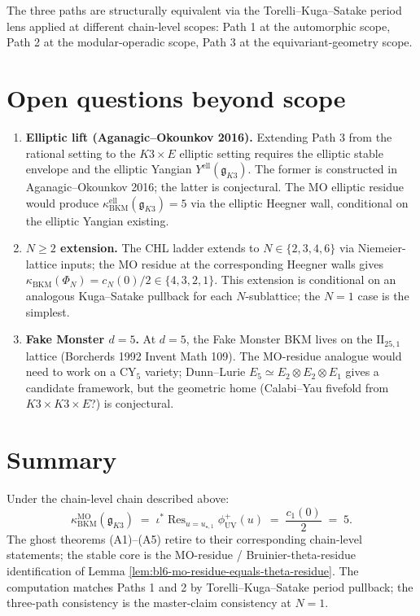 The three paths are structurally equivalent via the
Torelli--Kuga--Satake period lens applied at different chain-level
scopes: Path 1 at the automorphic scope, Path 2 at the
modular-operadic scope, Path 3 at the equivariant-geometry scope.

\section*{Open questions beyond scope}

\begin{enumerate}
\item \textbf{Elliptic lift (Aganagic--Okounkov 2016).}  Extending
   Path 3 from the rational setting to the $K3 \times E$ elliptic
   setting requires the elliptic stable envelope and the elliptic
   Yangian $Y^{\mathrm{ell}}(\mathfrak g_{K3})$.  The former is
   constructed in Aganagic--Okounkov 2016; the latter is
   conjectural.  The MO elliptic residue would produce
   $\kappa_{\mathrm{BKM}}^{\mathrm{ell}}(\mathfrak g_{K3}) = 5$ via
   the elliptic Heegner wall, conditional on the elliptic Yangian
   existing.

\item \textbf{$N \geq 2$ extension.}  The CHL ladder extends to
   $N \in \{2, 3, 4, 6\}$ via Niemeier-lattice inputs; the MO
   residue at the corresponding Heegner walls gives
   $\kappa_{\mathrm{BKM}}(\Phi_{N}) = c_{N}(0)/2 \in \{4, 3, 2, 1\}$.
   This extension is conditional on an analogous Kuga--Satake pullback
   for each $N$-sublattice; the $N = 1$ case is the simplest.

\item \textbf{Fake Monster $d = 5$.}  At $d = 5$, the Fake Monster
   BKM lives on the $\mathrm{II}_{25, 1}$ lattice (Borcherds 1992
   Invent Math 109).  The MO-residue analogue would need to work
   on a CY$_{5}$ variety; Dunn--Lurie $E_{5} \simeq
   E_{2} \otimes E_{2} \otimes E_{1}$ gives a candidate framework,
   but the geometric home (Calabi--Yau fivefold from
   $K3 \times K3 \times E$?) is conjectural.
\end{enumerate}

\section*{Summary}

Under the chain-level chain described above:
\[
   \boxed{\;
      \kappa_{\mathrm{BKM}}^{\mathrm{MO}}(\mathfrak g_{K3})
        \;=\;
      \iota^{*}\!\mathop{\mathrm{Res}}_{u = u_{\star, 1}}
        \phi^{+}_{\mathrm{UV}}(u)
        \;=\;
      \frac{c_{1}(0)}{2}
        \;=\;
      5.
   \;}
\]
The ghost theorems (A1)--(A5) retire to their corresponding
chain-level statements; the stable core is the MO-residue /
Bruinier-theta-residue identification of Lemma
\ref{lem:bl6-mo-residue-equals-theta-residue}.  The computation
matches Paths 1 and 2 by Torelli--Kuga--Satake period pullback; the
three-path consistency is the master-claim consistency at $N = 1$.

